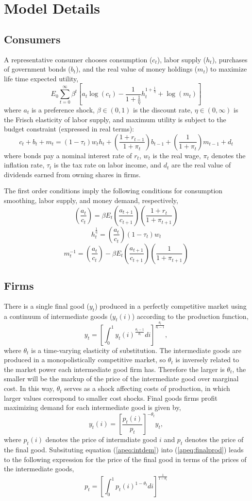 \documentclass[12pt]{article}
\newcommand{\beq}{\begin{equation}}
\newcommand{\eeq}{\end{equation}}
\newcommand{\appsection}[1]
{
\let\oldthesection\thesection
\renewcommand{\thesection}{Appendix \oldthesection:}
\section{#1}
\let\thesection\oldthesection
\renewcommand{\theequation}{\thesection.\arabic{equation}}
\setcounter{equation}{0}
}
\begin{document}
\appendix
\appsection{Model Details}
\subsection{Consumers}
A representative consumer chooses consumption ($c_t$), labor supply ($h_t$), purchases of government bonds ($b_t$), and the real value of money holdings ($m_t$) to maximize life time expected utility,
\beq E_0 \sum_{t=0}^{\infty} \beta^t \left[a_t \log(c_t) - \frac{1}{1+\frac{1}{\eta}} h_t^{1+\frac{1}{\eta}} + \log(m_t) \right] \eeq
where $a_t$ is a preference shock, $\beta\in(0,1)$ is the discount rate, $\eta\in(0,\infty)$ is the Frisch elasticity of labor supply, and maximum utility is subject to the budget constraint (expressed in real terms):
\beq c_t + b_t + m_t = (1-\tau_t) w_t h_t + \left(\frac{1+r_{t-1}}{1+\pi_t}\right) b_{t-1} + \left(\frac{1}{1+\pi_t}\right) m_{t-1} + d_t \eeq
where bonds pay a nominal interest rate of $r_t$, $w_t$ is the real wage, $\pi_t$ denotes the inflation rate, $\tau_t$ is the tax rate on labor income, and $d_t$ are the real value of dividends earned from owning shares in firms.

The first order conditions imply the following conditions for consumption smoothing, labor supply, and money demand, respectively,
\beq \label{apeq:euler}  \left(\frac{a_t}{c_t}\right) = \beta E_t \left(\frac{a_{t+1}}{c_{t+1}}\right) \left( \frac{1+r_t}{1+\pi_{t+1}} \right)  \eeq
\beq \label{apeq:lsupply} h_t^{\frac{1}{\eta}} = \left( \frac{a_t}{c_t} \right) (1-\tau_t) w_t  \eeq
\beq m_t^{-1} = \left(\frac{a_t}{c_t}\right) - \beta E_t \left(\frac{a_{t+1}}{c_{t+1}}\right)\left(\frac{1}{1+\pi_{t+1}}\right) \eeq

\subsection{Firms}
There is a single final good ($y_t$) produced in a perfectly competitive market using a continuum of intermediate goods ($y_t(i)$) according to the production function,
\beq \label{apeq:finalprod} y_t = \left[ \int_{0}^{1} y_t(i)^{\frac{\theta_t-1}{\theta_t}}di \right]^{\frac{\theta_t}{\theta_t-1}}, \eeq
where $\theta_t$ is a time-varying elasticity of substitution.  The intermediate goods are produced in a monopolistically competitive market, so $\theta_t$ is inversely related to the market power each intermediate good firm has.  Therefore the larger is $\theta_t$, the smaller will be the markup of the price of the intermediate good over marginal cost.  In this way, $\theta_t$ serves as a shock affecting costs of production, in which larger values correspond to smaller cost shocks.  Final goods firms profit maximizing demand for each intermediate good is given by,
\beq \label{apeq:intdem} y_t(i) = \left[ \frac{p_t(i)}{p_t}\right]^{-\theta_t} y_t, \eeq
where $p_t(i)$ denotes the price of intermdiate good $i$ and $p_t$ denotes the price of the final good.  Subsituting equation (\ref{apeq:intdem}) into (\ref{apeq:finalprod}) leads to the following expression for the price of the final good in terms of the prices of the intermediate goods,
\beq \label{apeq:price} p_t = \left[ \int_{0}^{1} p_t(i)^{1-\theta_t} di \right]^{\frac{1}{1-\theta_t} }\eeq
\end{document}

